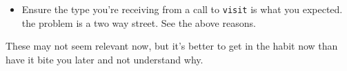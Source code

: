 \documentclass{article}
\newcommand{\code}[1]{\texttt{\textmd{#1}}}
\begin{document}
\begin{enumerate}
\begin{itemize}
        other words, don't return temporaries. For example, this will break if the receiving side
        wants a pointer to the parent class even though there's an available typesafe cast:
        \begin{lstlisting}
          {
            ...
            return std::make_shared<MyChildClass>(...);
          }
        \end{lstlisting}
      \item
        Ensure the type you're receiving from a call to \code{visit} is what you expected. the problem is a two
        way street. See the above reasons.
    \end{itemize}
    These may not seem relevant now, but it's better to get in the habit now than have it bite you
    later and not understand why.
\end{enumerate}
\end{document}
